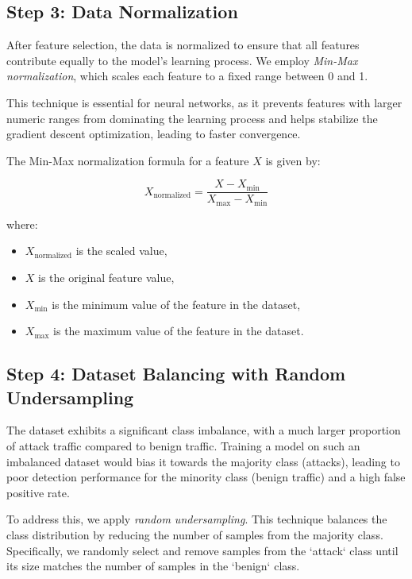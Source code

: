 \documentclass[12pt]{report}
\begin{document}
\subsection{Step 3: Data Normalization}


After feature selection, the data is normalized to ensure that all features contribute equally to the model’s learning process. We employ \textit{Min-Max normalization}, which scales each feature to a fixed range between 0 and 1.

This technique is essential for neural networks, as it prevents features with larger numeric ranges from dominating the learning process and helps stabilize the gradient descent optimization, leading to faster convergence.

The Min-Max normalization formula for a feature \( X \) is given by:

\[
X_{\text{normalized}} = \frac{X - X_{\min}}{X_{\max} - X_{\min}}
\]

where:

\begin{itemize}
    \item \( X_{\text{normalized}} \) is the scaled value,
    \item \( X \) is the original feature value,
    \item \( X_{\min} \) is the minimum value of the feature in the dataset,
    \item \( X_{\max} \) is the maximum value of the feature in the dataset.
\end{itemize}

\subsection{Step 4: Dataset Balancing with Random Undersampling}

The dataset exhibits a significant class imbalance, with a much larger proportion of attack traffic compared to benign traffic. Training a model on such an imbalanced dataset would bias it towards the majority class (attacks), leading to poor detection performance for the minority class (benign traffic) and a high false positive rate.

To address this, we apply \textit{random undersampling}. This technique balances the class distribution by reducing the number of samples from the majority class. Specifically, we randomly select and remove samples from the `attack` class until its size matches the number of samples in the `benign` class.
\end{document}
